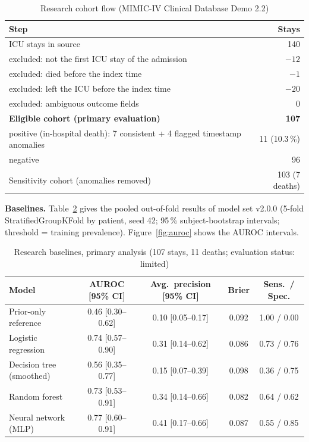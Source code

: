 \begin{table}[!htbp]
\centering
\caption{Research cohort flow (MIMIC-IV Clinical Database Demo 2.2)}
\label{tab:cohort}
\small
\begin{tabular}{@{}lr@{}}
\toprule
Step & Stays\\
\midrule
ICU stays in source & 140\\
\quad excluded: not the first ICU stay of the admission & $-12$\\
\quad excluded: died before the index time & $-1$\\
\quad excluded: left the ICU before the index time & $-20$\\
\quad excluded: ambiguous outcome fields & $0$\\
\textbf{Eligible cohort (primary evaluation)} & \textbf{107}\\
\quad positive (in-hospital death): 7 consistent + 4 flagged timestamp anomalies & 11 (10.3\,\%)\\
\quad negative & 96\\
Sensitivity cohort (anomalies removed) & 103 (7 deaths)\\
\bottomrule
\end{tabular}
\end{table}

\textbf{Baselines.} Table~\ref{tab:research} gives the pooled out-of-fold results of model set v2.0.0
(5-fold StratifiedGroupKFold by patient, seed 42; 95\,\% subject-bootstrap intervals; threshold = training
prevalence). Figure~\ref{fig:auroc} shows the AUROC intervals.

\begin{table}[!htbp]
\centering
\caption{Research baselines, primary analysis (107 stays, 11 deaths; evaluation status: limited)}
\label{tab:research}
\small
\begin{tabular}{@{}lcccc@{}}
\toprule
Model & AUROC [95\% CI] & Avg.\ precision [95\% CI] & Brier & Sens.\ / Spec.\\
\midrule
Prior-only reference & 0.46 [0.30--0.62] & 0.10 [0.05--0.17] & 0.092 & 1.00 / 0.00\\
Logistic regression & 0.74 [0.57--0.90] & 0.31 [0.14--0.62] & 0.086 & 0.73 / 0.76\\
Decision tree (smoothed) & 0.56 [0.35--0.77] & 0.15 [0.07--0.39] & 0.098 & 0.36 / 0.75\\
Random forest & 0.73 [0.53--0.91] & 0.34 [0.14--0.66] & 0.082 & 0.64 / 0.62\\
Neural network (MLP) & 0.77 [0.60--0.91] & 0.41 [0.17--0.66] & 0.087 & 0.55 / 0.85\\
\bottomrule
\end{tabular}
\end{table}

